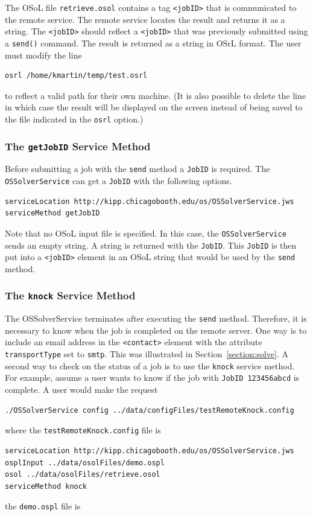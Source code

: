 The OSoL file {\tt retrieve.osol} contains a tag {\tt <jobID>} that is communicated to
the remote service. The remote service locates the result and returns it as a string.
The {\tt <jobID>} should reflect a {\tt <jobID>} that was previously submitted
using a {\tt send()} command.
The result is returned as a string in OSrL format.  The user must modify the line
\begin{verbatim}
osrl /home/kmartin/temp/test.osrl
\end{verbatim}
to reflect a valid path for their own machine.  (It is also possible to delete the line
in which case the result will be displayed on the screen instead of being saved to the
file indicated in the {\tt osrl} option.)


\subsubsection{The  {\tt getJobID} Service Method}\label{section:getjobid}

Before  submitting a job with the {\tt send} method a {\tt JobID}
is required. The {\tt OSSolverService} can get a {\tt JobID} with the following options.
\begin{verbatim}
serviceLocation http://kipp.chicagobooth.edu/os/OSSolverService.jws
serviceMethod getJobID
\end{verbatim}
Note that no OSoL input file is specified. In this case, the {\tt OSSolverService} sends an empty string.
A string is returned with the {\tt JobID}. This {\tt JobID} is then put into a {\tt <jobID>} element in an
OSoL string that would be used by the {\tt send} method.


\subsubsection{The  {\tt knock} Service Method}\label{section:knock}

The OSSolverService terminates after executing the {\tt send} method. Therefore,
it is necessary to know when the job is completed on the remote server. One way is to include an email
address in the  {\tt <contact>}  element with the attribute {\tt transportType} set to {\tt smtp}.
This was illustrated in Section~\ref{section:solve}.  A second way to check on the status of a job is
to use the {\tt knock} service method.  For example, assume a user   wants to know if  the job
with {\tt JobID 123456abcd}  is complete. A user would make the request
\begin{verbatim}
./OSSolverService config ../data/configFiles/testRemoteKnock.config
\end{verbatim}
where the {\tt testRemoteKnock.config} file is
\begin{verbatim}
serviceLocation http://kipp.chicagobooth.edu/os/OSSolverService.jws
osplInput ../data/osolFiles/demo.ospl
osol ../data/osolFiles/retrieve.osol
serviceMethod knock
\end{verbatim}
the {\tt demo.ospl} file is


